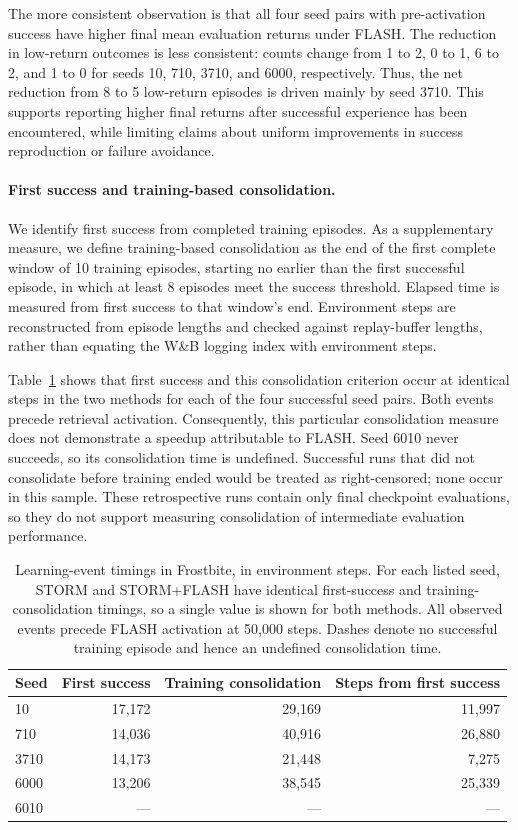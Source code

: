 \documentclass{article} %
\begin{document}
The more consistent observation is that all four seed pairs with pre-activation success have higher final mean evaluation returns under FLASH. The reduction in low-return outcomes is less consistent: counts change from 1 to 2, 0 to 1, 6 to 2, and 1 to 0 for seeds 10, 710, 3710, and 6000, respectively. Thus, the net reduction from 8 to 5 low-return episodes is driven mainly by seed 3710. This supports reporting higher final returns after successful experience has been encountered, while limiting claims about uniform improvements in success reproduction or failure avoidance.

\paragraph{First success and training-based consolidation.}
We identify first success from completed training episodes. As a supplementary measure, we define training-based consolidation as the end of the first complete window of 10 training episodes, starting no earlier than the first successful episode, in which at least 8 episodes meet the success threshold. Elapsed time is measured from first success to that window's end. Environment steps are reconstructed from episode lengths and checked against replay-buffer lengths, rather than equating the W\&B logging index with environment steps.

Table~\ref{tab:exploitation_timing} shows that first success and this consolidation criterion occur at identical steps in the two methods for each of the four successful seed pairs. Both events precede retrieval activation. Consequently, this particular consolidation measure does not demonstrate a speedup attributable to FLASH. Seed 6010 never succeeds, so its consolidation time is undefined. Successful runs that did not consolidate before training ended would be treated as right-censored; none occur in this sample. These retrospective runs contain only final checkpoint evaluations, so they do not support measuring consolidation of intermediate evaluation performance.

\begin{table}[!t]
\centering
\caption{Learning-event timings in Frostbite, in environment steps. For each listed seed, STORM and STORM+FLASH have identical first-success and training-consolidation timings, so a single value is shown for both methods. All observed events precede FLASH activation at 50,000 steps. Dashes denote no successful training episode and hence an undefined consolidation time.}
\label{tab:exploitation_timing}
\small
\begin{tabular}{lrrr}
\toprule
Seed & First success & Training consolidation & Steps from first success \\
\midrule
10   & 17,172 & 29,169 & 11,997 \\
710  & 14,036 & 40,916 & 26,880 \\
3710 & 14,173 & 21,448 & 7,275 \\
6000 & 13,206 & 38,545 & 25,339 \\
6010 & --- & --- & --- \\
\bottomrule
\end{tabular}
\end{table}
\end{document}

